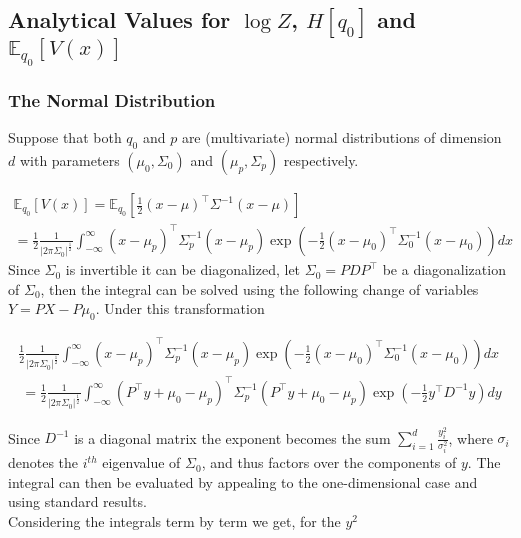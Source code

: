 \documentclass{article}
\begin{document}
\subsection{Analytical Values for $\log Z$, $H[q_0]$ and $\mathbb{E}_{q_0}[V(x)]$}
\subsubsection{The Normal Distribution}
\label{sec:gaussian_logz}

Suppose that both $q_0$ and $p$ are (multivariate) normal distributions of dimension
$d$ with parameters $(\mu_0, \Sigma_0)$ and $(\mu_p, \Sigma_p)$ respectively.

\begin{gather}
    \mathbb{E}_{q_0}[V(x)] = \mathbb{E}_{q_0}[ \frac{1}{2} (x - \mu)^{\top} \Sigma^{-1}(x - \mu) ] \\
    = \frac{1}{2}\frac{1}{|2\pi\Sigma_0|^{\frac{1}{2}}} \int_{-\infty}^{\infty} 
    (x-\mu_p)^{\top} \Sigma^{-1}_p (x-\mu_p) 
    \exp \left( - \frac{1}{2}(x-\mu_0)^{\top}\Sigma^{-1}_0 (x-\mu_0) \right) dx
\end{gather}
Since $\Sigma_0$ is invertible it can be diagonalized, let $\Sigma_0 = PDP^{\top}$
be a diagonalization of $\Sigma_0$, then the integral can be solved using the following
change of variables $Y = PX - P\mu_0$. Under this transformation

\small
\begin{gather}
    \frac{1}{2}\frac{1}{|2\pi\Sigma_0|^{\frac{1}{2}}} \int_{-\infty}^{\infty} (x-\mu_p)^{\top} \Sigma^{-1}_p (x-\mu_p) 
    \exp \left(- \frac{1}{2}(x-\mu_0)^{\top}\Sigma^{-1}_0 (x-\mu_0) \right) dx \\
    \
    = \frac{1}{2}\frac{1}{|{2\pi}\Sigma_0|^{\frac{1}{2}}} \int_{-\infty}^{\infty} 
    (P^{\top}y+\mu_0-\mu_p)^{\top} \Sigma^{-1}_p (P^{\top}y+\mu_0-\mu_p) 
    \exp \left( -\frac{1}{2}y^{\top}D^{-1} y \right) dy 
\end{gather}
\normalsize
 
Since $D^{-1}$ is a diagonal matrix the exponent becomes the sum $\sum_{i=1}^d \frac{y_i^2}{\sigma_i^2}$,
where $\sigma_i$ denotes the $i^{th}$ eigenvalue of $\Sigma_0$,
and thus factors over the components of $y$. The integral can then be evaluated by appealing
to the one-dimensional case and using standard results.\\
Considering the integrals term by term we get, for the $y^2$
\end{document}
